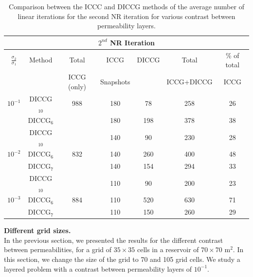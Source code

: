 \documentclass[12pt]{article}
\begin{document}
\begin{table}
\begin{minipage}{1\textwidth}
\vspace{-10pt}
\centering
\begin{tabular}{ |c|c|c|c|c|c|c|} 

\hline
\multicolumn{7}{|c|}{$2^{nd}$ NR Iteration}  \\
\hline
$\frac{\sigma_2}{\sigma_1}$&Method& Total & ICCG&DICCG &Total&\% of total\\
                           &      & ICCG (only) & Snapshots& &ICCG+DICCG& ICCG\\
\hline
$10^{-1}$ &DICCG$_{10}$& 988&180&78&  258& 26\\
&DICCG$_6$& &180&198&  378& 38\\
\hline
&DICCG$_{10}$& &140&90&  230&28\\
$10^{-2}$ &DICCG$_6$& 832&140&260&  400&48\\
&DICCG$_7$&&140&154&  294&33\\
\hline
&DICCG$_{10}$&&110&90&  200&23 \\
$10^{-3}$ &DICCG$_6$&884&110&520&  630&71 \\
&DICCG$_7$& &110&150&  260& 29\\
 \hline
 \end{tabular}
\caption{Comparison between the ICCC and DICCG methods of the average number of linear iterations for the second NR iteration for various contrast between permeability layers. }\label{table:litertot2}
\end{minipage}
\end{table}






\clearpage
\newpage
\textbf{Different grid sizes.}\\
In the previous section, we presented the results for the different contrast between permeabilities, 
for a grid of $35 \times 35$ cells in a reservoir of $70\times 70$ m$^2$. In this section, we change the size of
the grid to 70 and 105 grid cells. We study a layered problem with a contrast between permeability layers of $10^{-1}$.
\end{document}
